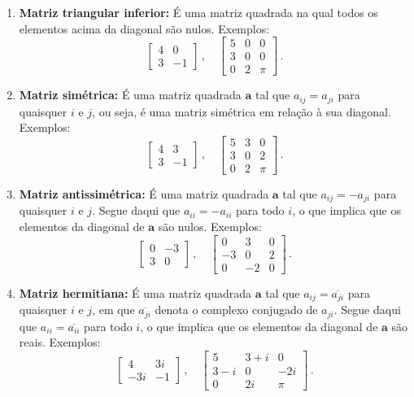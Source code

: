 \documentclass[12pt,a4paper]{report}
\newcommand{\tb}{\textbf}
\newcommand{\mb}{\mathbf}
\begin{document}
\begin{enumerate}
  \item \tb{Matriz triangular inferior:} É uma matriz quadrada na qual todos os elementos acima da diagonal são nulos. Exemplos:
  $$\begin{bmatrix}
    4&0\\
    3&-1
  \end{bmatrix}\,,\quad \begin{bmatrix}
    5&0&0\\
    3&0&0\\
    0&2&\pi
  \end{bmatrix}\,.$$
  \item \tb{Matriz simétrica:} É uma matriz quadrada $\mb{a}$ tal que $a_{ij}=a_{ji}$ para quaisquer $i$ e $j$, ou seja, é uma matriz simétrica em relação à sua diagonal. Exemplos:
  $$\begin{bmatrix}
    4&3\\
    3&-1
  \end{bmatrix}\,,\quad \begin{bmatrix}
    5&3&0\\
    3&0&2\\
    0&2&\pi
  \end{bmatrix}\,.$$
  \item \tb{Matriz antissimétrica:} É uma matriz quadrada $\mb{a}$ tal que $a_{ij}=-a_{ji}$ para quaisquer $i$ e $j$. Segue daqui que $a_{ii}=-a_{ii}$ para todo $i$, o que implica que os elementos da diagonal de $\mb a$ são nulos. Exemplos:
  $$\begin{bmatrix}
    0&-3\\
    3&0
  \end{bmatrix}\,,\quad \begin{bmatrix}
    0&3&0\\
    -3&0&2\\
    0&-2&0
  \end{bmatrix}\,.$$
  \item \tb{Matriz hermitiana:} É uma matriz quadrada $\mb a$ tal que $a_{ij}=\overline{a_{ji}}$ para quaisquer $i$ e $j$, em que $\overline{a_{ji}}$ denota o complexo conjugado de $a_{ji}$. Segue daqui que $a_{ii}=\overline{a_{ii}}$ para todo $i$, o que implica que os elementos da diagonal de $\mb a$ são reais. Exemplos:
  $$\begin{bmatrix}
    4&3i\\
    -3i&-1
  \end{bmatrix}\,,\quad \begin{bmatrix}
    5&3+i&0\\
    3-i&0&-2i\\
    0&2i&\pi
  \end{bmatrix}\,.$$
\end{enumerate}
\end{document}
